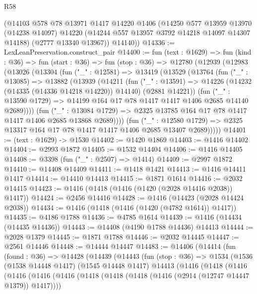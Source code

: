 \begin{lexlean}{R58}
\begin{coremodule}
{{      (@14103
        @578
        @78
        @13971
        @1417
        @14220
        @1406
        (@14250
          @577
          @13959
          @13970
          (@14238 @14097)
          @14220
          (@14244 @557 @13957 @3792 @14218 @14097 @14307 @14188)
          (@2777 @13340 @13967))
        @14140))
@14336 := LexLeanPreservation.construct_pair
@14400 := fun (text : @1629) =>
  fun (kind : @36) =>
  fun (start : @36) =>
  fun (stop : @36) =>
  @12780
    (@12939
      (@12983
        (@13026
          (@13304
            (fun ("_" : @12581) =>
            @13419
              (@13529
                (@13764
                  (fun ("_" : @13085) =>
                  @13882
                    (@13939
                      (@14211
                        (fun ("_" : @13591) =>
                        @14226 (@14232 (@14335 (@14336 @14218 @14220)) @14140) (@2881 @14221))
                        (fun ("_" : @13590 @1729) =>
                        @14199 @164 @17 @78 @1417 @1417 @1406 @2685 @14140 @2689))))
                  (fun ("_" : @13084 @1729) =>
                  @2325 @13785 @164 @17 @78 @1417 @1417 @1406 @2685 @13868 @2689))))
            (fun ("_" : @12580 @1729) =>
            @2325 @13317 @164 @17 @78 @1417 @1417 @1406 @2685 @13407 @2689)))))
@14401 := (text : @1629) -> @1530
@14402 := @1420 @1869
@14403 := @1416 @14402
@14404 := @2993 @1872
@14405 := @1532 @14404
@14406 := @1416 @14405
@14408 := @3398 (fun ("_" : @2507) => @1414)
@14409 := @2997 @1872
@14410 := @14408 @14409
@14411 := @1418 @1421
@14413 := @1416 @14411 @1417
@14414 := @14410 @14413
@14415 := @1871 @1614
@14416 := @2032 @14415
@14423 := @1416 (@1418 (@1416 (@1420 (@2028 @14416 @2038)) @1417))
@14424 := @2456 @14416
@14428 := @1416 (@14423 (@2028 @14424 @2038))
@14434 := @1416 (@1418 (@1416 (@1420 (@4782 @1614)) @1417))
@14435 := @4186 @1788
@14436 := @4785 @1614
@14439 := @1416 (@14434 (@14435 @14436))
@14443 := @14408 (@4190 @1788 @14436) @14413
@14444 := @2028 @1379
@14445 := @1871 @1788
@14446 := @2032 @14445
@14447 := @2561 @14446
@14448 := @14444 @14447
@14483 := @14406
    (@14414
      (fun (found : @36) =>
      @14428
        (@14439
          (@14443
            (fun (stop : @36) =>
            @1534
              (@1536
                (@1538 @14448 @1417)
                (@1545 @14448 @1417)
                @14413
                (@1416
                  (@1418
                    (@1416
                      (@1416
                        (@1416
                          (@1416
                            (@1418 (@1418 (@1418 (@1416 (@2914 (@12747 @14447 @1379)) @1417))))
}}
\end{coremodule}
\end{lexlean}
